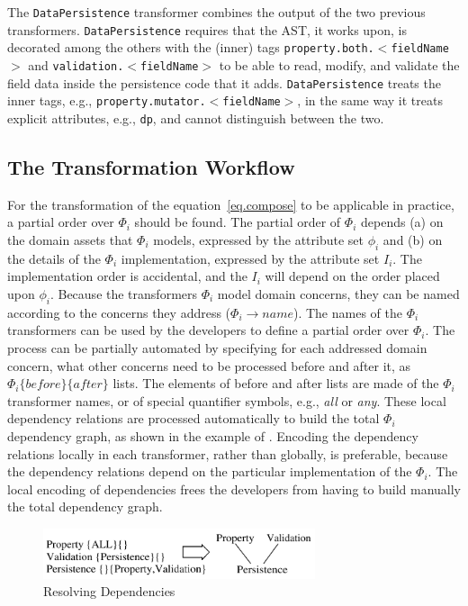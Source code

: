 The \texttt{Da\-ta\-Per\-si\-ste\-nce} transformer combines the output of the two previous transformers.  \texttt{Da\-ta\-Per\-si\-ste\-nce} requires that the AST, it works upon, is decorated among the others with the (inner) tags \texttt{prope\-rty.both.$<$field\-Na\-me$>$} and \texttt{va\-li\-da\-tion.$<$field\-Na\-me$>$} to be able to read, modify, and validate the field data inside the persistence code that it adds. \texttt{Da\-ta\-Per\-si\-ste\-nce} treats the inner tags, e.g., \texttt{pro\-per\-ty.mu\-ta\-tor.$<$field\-Na\-me$>$}, in the same way it treats explicit attributes, e.g.,  \texttt{dp}, and cannot distinguish between the two.

\subsection{The Transformation Workflow}
\label{sec.workflow}

For the transformation of the equation~\ref{eq.compose} to be applicable in practice, a partial order over $\Phi_i$ should be found. The partial order of $\Phi_i$ depends (a) on the domain assets that $\Phi_i$ models, expressed by the attribute set $\phi_i$ and (b) on the details of the $\Phi_i$ implementation, expressed by the attribute set $I_i$. The implementation order is accidental, and the $I_i$ will depend on the order placed upon $\phi_i$. Because the transformers $\Phi_i$ model domain concerns, they can be named according to the concerns they address ($\Phi_i\rightarrow name$). The names of the $\Phi_i$ transformers can be used by the developers to define a partial order over $\Phi_i$. The process can be partially automated by specifying for each addressed domain concern, what other concerns need to be processed before and after it, as $\Phi_i\{before\} \{after\}$ lists. The elements of before and after lists are made of the $\Phi_i$ transformer names, or of special quantifier symbols, e.g., \textit{all} or \textit{any}. These local dependency relations are processed automatically to build the total $\Phi_i$ dependency graph, as shown in the example of . Encoding the dependency relations locally in each transformer, rather than globally, is preferable, because the dependency relations depend on the particular implementation of the $\Phi_i$. The local encoding of dependencies frees the developers from having to build manually the total dependency graph.

\begin{figure}[ht]
		\centering
		\includegraphics[width=8cm,height=!]{ch04/dependency}
	\caption{Resolving Dependencies}
	\label{fig.dependency}
\end{figure}
 
